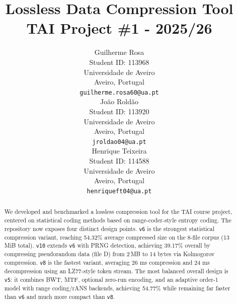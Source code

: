 \documentclass{article}
\title{Lossless Data Compression Tool\\
{\large TAI Project \#1 - 2025/26}}
\author{
 Guilherme Rosa \\
  Student ID: 113968\\
  Universidade de Aveiro\\
  Aveiro, Portugal \\
  \texttt{guilherme.rosa60@ua.pt} \\
  \And
 João Roldão \\
  Student ID: 113920\\
  Universidade de Aveiro\\
  Aveiro, Portugal \\
  \texttt{jroldao04@ua.pt} \\
  \And
 Henrique Teixeira \\
  Student ID: 114588\\
  Universidade de Aveiro\\
  Aveiro, Portugal \\
  \texttt{henriqueft04@ua.pt} \\
}
\begin{document}
\maketitle

\begin{abstract}
We developed and benchmarked a lossless compression tool for the TAI course project, centered on statistical coding methods based on range-coder-style entropy coding. The repository now exposes four distinct design points. \texttt{v6} is the strongest statistical compression variant, reaching 54.32\% average compressed size on the 8-file corpus (13 MiB total). \texttt{v10} extends \texttt{v6} with PRNG detection, achieving 39.17\% overall by compressing pseudorandom data (file D) from 2\,MB to 14 bytes via Kolmogorov compression. \texttt{v8} is the fastest variant, averaging 26 ms compression and 24 ms decompression using an LZ77-style token stream. The most balanced overall design is \texttt{v5}: it combines BWT, MTF, optional zero-run encoding, and an adaptive order-1 model with range coding/rANS backends, achieving 54.77\% while remaining far faster than \texttt{v6} and much more compact than \texttt{v8}.
\end{abstract}












\end{document}
